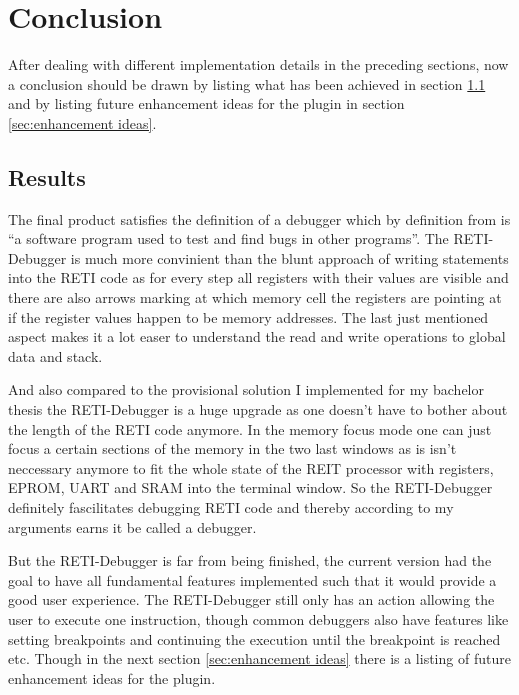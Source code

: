 \documentclass{report}
\begin{document}

\vspace{0.5cm}
\chapter{Conclusion}

After dealing with different implementation details in the preceding sections, now a conclusion should be drawn by listing what has been achieved in section \ref{sec:results} and by listing future enhancement ideas for the plugin in section \ref{sec:enhancement ideas}.

\section{Results}
\label{sec:results}

The final product satisfies the definition of a \alert{debugger} which by definition from \cite{Debugger2022} is \enquote{a software program used to test and find bugs in other programs}. The RETI-Debugger is much more convinient than the blunt approach of writing  statements into the RETI code as for every step all registers with their values are visible and there are also arrows marking at which memory cell the registers are pointing at if the register values happen to be memory addresses. The last just mentioned aspect makes it a lot easer to understand the read and write operations to global data and stack.

And also compared to the provisional solution I implemented for my bachelor thesis the RETI-Debugger is a huge upgrade as one doesn't have to bother about the length of the RETI code anymore. In the memory focus mode one can just focus a certain sections of the memory in the two last windows as is isn't neccessary anymore to fit the whole state of the REIT processor with registers, EPROM, UART and SRAM into the terminal window. So the RETI-Debugger definitely fascilitates debugging RETI code and thereby according to my arguments earns it be called a debugger.

But the RETI-Debugger is far from being finished, the current version had the goal to have all fundamental features implemented such that it would provide a good user experience. The RETI-Debugger still only has an action allowing the user to execute one instruction, though common debuggers also have features like setting breakpoints and continuing the execution until the breakpoint is reached etc. Though in the next section \ref{sec:enhancement ideas} there is a listing of future enhancement ideas for the plugin.
\end{document}
